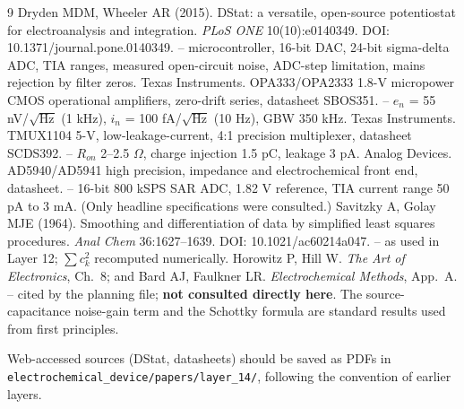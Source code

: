 \documentclass[10pt]{article}
\numberwithin{equation}{section}
\begin{document}
\begin{thebibliography}{9}\small
{} Dryden MDM, Wheeler AR (2015). DStat: a versatile, open-source potentiostat for electroanalysis and integration. \emph{PLoS ONE} 10(10):e0140349. DOI: 10.1371/journal.pone.0140349. -- microcontroller, 16-bit DAC, 24-bit sigma-delta ADC, TIA ranges, measured open-circuit noise, ADC-step limitation, mains rejection by filter zeros.
 Texas Instruments. OPA333/OPA2333 1.8-V micropower CMOS operational amplifiers, zero-drift series, datasheet SBOS351. -- $e_n$ = 55 nV/$\sqrt{\text{Hz}}$ (1 kHz), $i_n$ = 100 fA/$\sqrt{\text{Hz}}$ (10 Hz), GBW 350 kHz.
 Texas Instruments. TMUX1104 5-V, low-leakage-current, 4:1 precision multiplexer, datasheet SCDS392. -- $R_{on}$ 2--2.5 $\Omega$, charge injection 1.5 pC, leakage 3 pA.
 Analog Devices. AD5940/AD5941 high precision, impedance and electrochemical front end, datasheet. -- 16-bit 800 kSPS SAR ADC, 1.82 V reference, TIA current range 50 pA to 3 mA. (Only headline specifications were consulted.)
 Savitzky A, Golay MJE (1964). Smoothing and differentiation of data by simplified least squares procedures. \emph{Anal Chem} 36:1627--1639. DOI: 10.1021/ac60214a047. -- as used in Layer 12; $\sum c_k^2$ recomputed numerically.
 Horowitz P, Hill W. \emph{The Art of Electronics}, Ch.~8; and Bard AJ, Faulkner LR. \emph{Electrochemical Methods}, App.~A. -- cited by the planning file; \textbf{not consulted directly here}. The source-capacitance noise-gain term and the Schottky formula are standard results used from first principles.
\end{thebibliography}

\small Web-accessed sources (DStat, datasheets) should be saved as PDFs in \texttt{electrochemical\_device/papers/layer\_14/}, following the convention of earlier layers.
\end{document}
